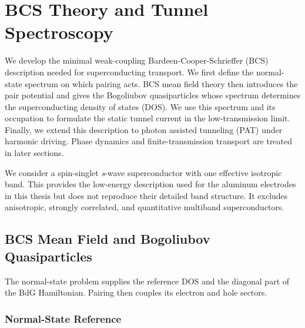 
\section{BCS Theory and Tunnel Spectroscopy}
\label{sec:micro}

    We develop the minimal weak-coupling Bardeen-Cooper-Schrieffer (BCS) description needed for superconducting transport. We first define the normal-state spectrum on which pairing acts. BCS mean field theory then introduces the pair potential and gives the Bogoliubov quasiparticles whose spectrum determines the superconducting density of states (DOS). We use this spectrum and its occupation to formulate the static tunnel current in the low-transmission limit. Finally, we extend this description to photon assisted tunneling (PAT) under harmonic driving. Phase dynamics and finite-transmission transport are treated in later sections. \cite{bardeen_theory_1957,tinkham_introduction_2004}

    We consider a spin-singlet \textit{s}-wave superconductor with one effective isotropic band. This provides the low-energy description used for the aluminum electrodes in this thesis but does not reproduce their detailed band structure. It excludes anisotropic, strongly correlated, and quantitative multiband superconductors.

    \subsection{BCS Mean Field and Bogoliubov Quasiparticles}
    \label{subsec:micro:bcs-bdg}

        The normal-state problem supplies the reference DOS and the diagonal part of the BdG Hamiltonian. Pairing then couples its electron and hole sectors.

        \subsubsection*{Normal-State Reference}
        \label{subsubsec:micro:normal-reference}

